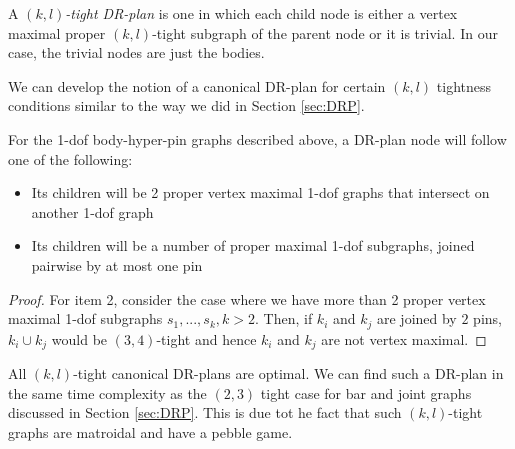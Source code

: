 \begin{definition}
    A \emph{$(k,l)$-tight DR-plan} is one in which each child node is either a vertex maximal proper $(k,l)$-tight subgraph of the parent node or it is trivial. In our case, the trivial nodes are just the bodies.
\end{definition}

We can develop the notion of a canonical DR-plan for certain $(k,l)$ tightness conditions similar to the way we did in Section \ref{sec:DRP}.

\begin{observation}
    For the 1-dof body-hyper-pin graphs described above, a DR-plan node will follow one of the following:

    \begin{itemize}
        \item Its children will be 2 proper vertex maximal 1-dof graphs that intersect on another 1-dof graph
        \item Its children will be a number of proper maximal 1-dof subgraphs, joined pairwise by at most one pin
    \end{itemize}
\end{observation}

\begin{proof}

    For item 2, consider the case where we have more than 2 proper vertex maximal 1-dof subgraphs $s_1, ..., s_k, k > 2$. Then, if $k_i$ and $k_j$ are joined by $2$ pins, $k_i \cup k_j$ would be $(3,4)$-tight and hence $k_i$ and $k_j$ are not vertex maximal.
\end{proof}

\begin{remark}
\label{rem:1dofcanon}

    All $(k,l)$-tight canonical DR-plans are optimal. We can find such a DR-plan in the same time complexity as the $(2,3)$ tight case for bar and joint graphs discussed in Section \ref{sec:DRP}. This is due tot he fact that such $(k,l)$-tight graphs are matroidal and have a pebble game.
\end{remark}


